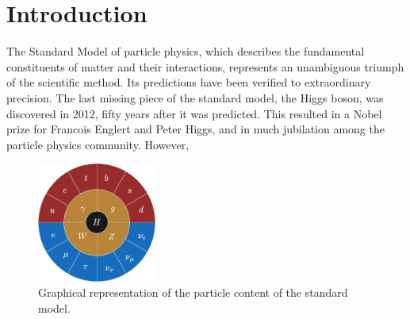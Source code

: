 \chapter{Introduction}\label{ch:introduction}

The Standard Model of particle physics, which describes the fundamental constituents of matter and their interactions, represents an unambiguous triumph of the scientific method. Its predictions have been verified to extraordinary precision. The last missing piece of the standard model, the Higgs boson, was discovered in 2012, fifty years after it was predicted. This resulted in a Nobel prize for Francois Englert and Peter Higgs, and in much jubilation among the particle physics community. However, 

\begin{figure}
  \centering
  \includegraphics[width=0.35\textwidth]{gfx/SM-wheel.png}
  \caption{Graphical representation of the particle content of the standard model.}
\end{figure}




